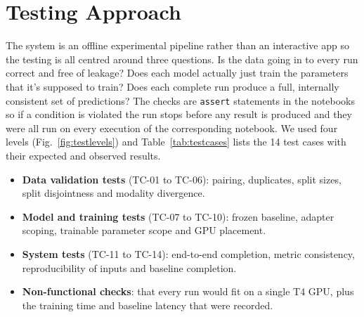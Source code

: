 \documentclass[12pt]{report}
\begin{document}
\section{Testing Approach}
The system is an offline experimental pipeline rather than an interactive app so the testing is all centred around three questions. Is the data going in to every run correct and free of leakage? Does each model actually just train the parameters that it's supposed to train? Does each complete run produce a full, internally consistent set of predictions? The checks are \texttt{assert} statements in the notebooks so if a condition is violated the run stops before any result is produced and they were all run on every execution of the corresponding notebook. We used four levels (Fig.~\ref{fig:testlevels}) and Table~\ref{tab:testcases} lists the 14 test cases with their expected and observed results.
\begin{itemize}[leftmargin=0.5in, itemsep=2pt]
  \item \textbf{Data validation tests} (TC-01 to TC-06): pairing, duplicates, split sizes, split disjointness and modality divergence.
  \item \textbf{Model and training tests} (TC-07 to TC-10): frozen baseline, adapter scoping, trainable parameter scope and GPU placement.
  \item \textbf{System tests} (TC-11 to TC-14): end-to-end completion, metric consistency, reproducibility of inputs and baseline completion.
  \item \textbf{Non-functional checks}: that every run would fit on a single T4 GPU, plus the training time and baseline latency that were recorded.
\end{itemize}
\end{document}
